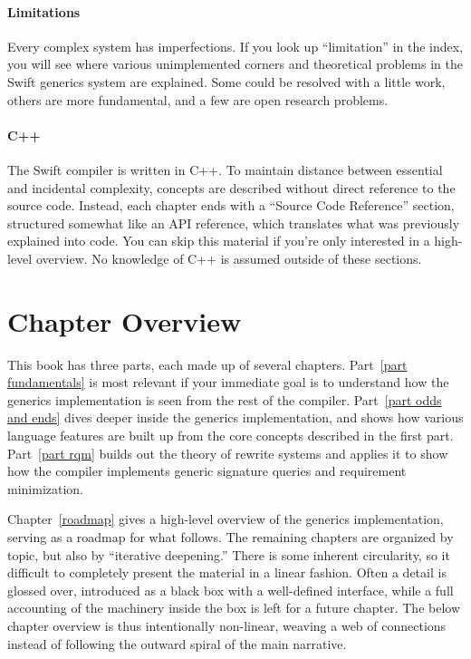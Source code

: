 \documentclass[../generics]{subfiles}
\begin{document}
\paragraph{Limitations}
Every complex system has imperfections. If you look up ``limitation'' in the index, you will see where various unimplemented corners and theoretical problems in the Swift generics system are explained. Some could be resolved with a little work, others are more fundamental, and a few are open research problems.

\paragraph{C++}
The Swift compiler is written in C++. To maintain distance between essential and incidental complexity, concepts are described without direct reference to the source code. Instead, each chapter ends with a ``Source Code Reference'' section, structured somewhat like an API reference, which translates what was previously explained into code. You can skip this material if you're only interested in a high-level overview. No knowledge of C++ is assumed outside of these sections.

\section*{Chapter Overview}

This book has three parts, each made up of several chapters. Part~\ref{part fundamentals} is most relevant if your immediate goal is to understand how the generics implementation is seen from the rest of the compiler. Part~\ref{part odds and ends} dives deeper inside the generics implementation, and shows how various language features are built up from the core concepts described in the first part. Part~\ref{part rqm} builds out the theory of rewrite systems and applies it to show how the compiler implements generic signature queries and requirement minimization.

Chapter~\ref{roadmap} gives a high-level overview of the generics implementation, serving as a roadmap for what follows. The remaining chapters are organized by topic, but also by ``iterative deepening.'' There is some inherent circularity, so it difficult to completely present the material in a linear fashion. Often a detail is glossed over, introduced as a black box with a well-defined interface, while a full accounting of the machinery inside the box is left for a future chapter. The below chapter overview is thus intentionally non-linear, weaving a web of connections instead of following the outward spiral of the main narrative.
\end{document}
